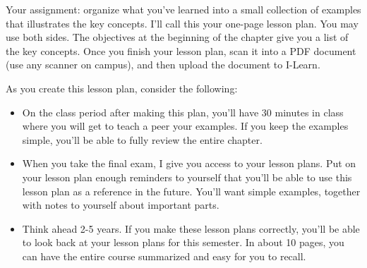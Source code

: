 \begin{problem} 
Your assignment: organize what you've learned into a small collection of examples that illustrates the key concepts. I'll call this your one-page lesson plan. You may use both sides. The objectives at the beginning of the chapter give you a list of the key concepts. Once you finish your lesson plan, scan it into a PDF document (use any scanner on campus), and then upload the document to I-Learn.

As you create this lesson plan, consider the following:
\begin{itemize}
 \item On the class period after making this plan, you'll have 30 minutes in class where you will get to teach a peer your examples. If you keep the examples simple, you'll be able to fully review the entire chapter.
 \item When you take the final exam, I give you access to your lesson plans. Put on your lesson plan enough reminders to yourself that you'll be able to use this lesson plan as a reference in the future.  You'll want simple examples, together with notes to yourself about important parts.
 \item Think ahead 2-5 years. If you make these lesson plans correctly, you'll be able to look back at your lesson plans for this semester. In about 10 pages, you can have the entire course summarized and easy for you to recall.
\end{itemize}
\end{problem}















